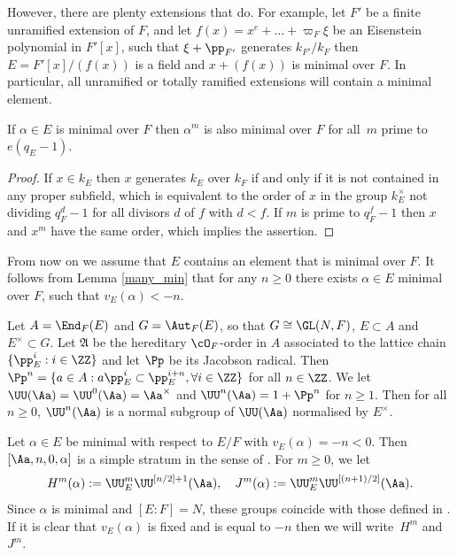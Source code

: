 However, there are plenty extensions that do. For example, let $F'$ be a finite unramified extension of $F$,
and let $f(x)=x^e+\ldots + \varpi_F \xi$ be an Eisenstein polynomial in $F'[x]$, such that $\xi +\pp_{F'}$ generates $k_{F'}/k_F$ then $E=F'[x]/(f(x))$ is a
field and $x +(f(x))$ is minimal over $F$. In particular, all unramified or totally ramified extensions will contain a minimal element.

\begin{lem}\label{many_min} If $\alpha\in E$ is minimal over $F$ then $\alpha^m$ is also minimal over $F$ for all~$m$ prime to $e(q_E-1)$.
\end{lem}

\begin{proof} If $x\in k_E$ then $x$ generates $k_E$ over $k_F$ if and only if it is not contained in any proper subfield, which
is equivalent to the order of $x$ in the group $k_E^{\times}$ not dividing $q_F^d-1$ for all divisors $d$ of $f$ with $d<f$.
If $m$ is prime to $q_F^f-1$ then $x$ and $x^m$ have the same order, which implies the assertion.
\end{proof}

From now on we assume that $E$ contains an element that is minimal over $F$. It follows from Lemma \ref{many_min} that for any $n\ge 0$ there
exists $\alpha\in E$ minimal over $F$, such that $v_E(\alpha)< -n$.

Let $A=\End_F(E)$ and $G=\Aut_F(E)$, so that $G\cong \GL(N, F)$, $E\subset A$ and $E^{\times}\subset G$. Let $\mathfrak A$ be the hereditary $\cO_F$-order in $A$ associated to
the lattice chain $\{\pp_E^i: i\in \ZZ\}$ and let $\Pp$ be its Jacobson radical. Then $\Pp^n = \{a\in A: a \pp_E^i\subset \pp_E^{i+n}, \forall i\in \ZZ\}$ for all $n\in \ZZ$.
We let $\UU(\Aa)=\UU^0(\Aa)= \Aa^{\times}$ and $\UU^n(\Aa)=1+ \Pp^n$ for $n\ge 1$. Then for all $n\ge 0$, $\UU^n(\Aa)$ is a normal subgroup of $\UU(\Aa)$ normalised by $E^{\times}$.

Let $\alpha\in E$ be minimal with respect to $E/F$ with $v_E(\alpha)=-n<0$. Then $[\Aa, n, 0, \alpha]$ is a simple stratum in the sense of \cite[(1.5.5)]{BK}. For $m\ge 0$, we let
\[
H^{m}(\alpha):= \UU_E^m \UU^{[n/2]+1}(\Aa), \quad J^m(\alpha):= \UU_E^m \UU^{[(n+1)/2]}(\Aa).
\]
Since $\alpha$ is minimal and $[E:F]=N$, these groups coincide with those defined in \hbox{\cite[(3.1.14)]{BK}}. If it is clear that $v_E(\alpha)$ is fixed and is equal to $-n$ then we will
write~$H^{m}$ and $J^m$.

